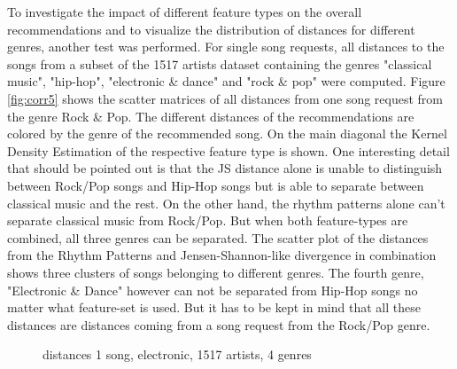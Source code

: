 \noindent To investigate the impact of different feature types on the overall recommendations and to visualize the distribution of distances for different genres, another test was performed. For single song requests, all distances to the songs from a subset of the 1517 artists dataset containing the genres "classical music", "hip-hop", "electronic \& dance" and "rock \& pop" were computed. Figure \ref{fig:corr5} shows the scatter matrices of all distances from one song request from the genre Rock \& Pop. The different distances of the recommendations are colored by the genre of the recommended song. 
\noindent On the main diagonal the Kernel Density Estimation of the respective feature type is shown. One interesting detail that should be pointed out is that the JS distance alone is unable to distinguish between Rock/Pop songs and Hip-Hop songs but is able to separate between classical music and the rest. On the other hand, the rhythm patterns alone can't separate classical music from Rock/Pop. But when both feature-types are combined, all three genres can be separated. The scatter plot of the distances from the Rhythm Patterns and Jensen-Shannon-like divergence in combination shows three clusters of songs belonging to different genres. The fourth genre, "Electronic \& Dance" however can not be separated from Hip-Hop songs no matter what feature-set is used. But it has to be kept in mind that all these distances are distances coming from a song request from the Rock/Pop genre. 

\begin{figure}[htbp]
	\centering
	\caption{distances 1 song, electronic, 1517 artists, 4 genres}
	\label{fig:corr6}
\end{figure}
\FloatBarrier

